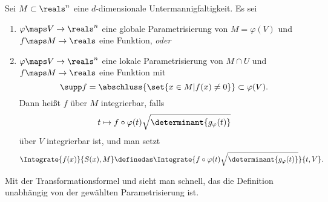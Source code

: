 \begin{definition}\label{mannigfaltigkeit_integral}
  Sei \( M\subset \reals^n \) eine \( d \)-dimensionale Untermannigfaltigkeit. Es sei 
  \begin{enumerate}[label=\rechtsklammer{\alph*}]
    \item\label{mannigfaltigkeit_integral:globale_parametisierung} \( \varphi\maps V\to \reals^n \) eine globale Parametrisierung von \( M=\varphi(V) \) und \( f\maps M\to \reals \) eine Funktion, \emph{oder}
    \item\label{mannigfaltigkeit_integral:lokale_parametisierung} \( \varphi\maps V\to \reals^n \) eine lokale Parametrisierung von \( M\cap U \) und \( f\maps M\to \reals \) eine Funktion mit 
    \begin{equation*}
      \supp f=\abschluss{\set{x\in M|f(x)\neq 0}}\subset \varphi(V).
    \end{equation*}
    Dann heißt \( f \) über \( M \) integrierbar, falls
    \begin{equation*}
      t\mapsto f\circ \varphi(t)\sqrt{\determinant{g_{\varphi}(t)}}
    \end{equation*}
    über \( V \) integrierbar ist, und man setzt
    \begin{equation*}
      \Integrate{f(x)}{S(x),M}\definedas \Integrate{f\circ \varphi(t)\sqrt{\determinant{g_{\varphi}(t)}}}{t,V}.
    \end{equation*}
  \end{enumerate}
\end{definition}
\begin{bemerkung*}
  Mit der Transformationsformel und  sieht man schnell, das die Definition unabhängig von der gewählten Parametrisierung ist.
\end{bemerkung*}

